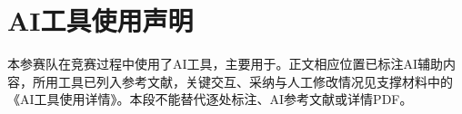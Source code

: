 \section*{AI工具使用声明}

本参赛队在竞赛过程中使用了AI工具，主要用于。正文相应位置已标注AI辅助内容，所用工具已列入参考文献，关键交互、采纳与人工修改情况见支撑材料中的《AI工具使用详情》。本段不能替代逐处标注、AI参考文献或详情PDF。
